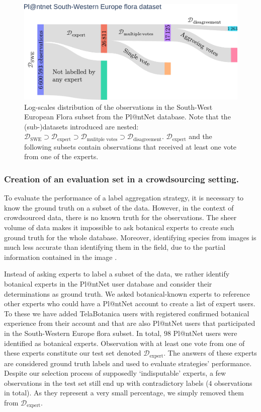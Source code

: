 \begin{figure}[tbh]
    \begin{center}
        \includegraphics[width=\textwidth]{./images_plantnet/sankey_v2.pdf}
    \end{center}
    \caption{Log-scales distribution of the observations in the South-West European Flora subset from the Pl@ntNet database. Note that the (sub-)datasets introduced are nested: $\mathcal{D}_{\mathrm{SWE}} \supset \mathcal{D}_\text{expert} \supset \mathcal{D}_{\text{mulitple votes}} \supset \mathcal{D}_{\text{disagreement}}$. $\mathcal{D}_{\text{expert}}$ and the following subsets contain observations that received at least one vote from one of the experts.}
    \label{fig:sankey}
\end{figure}

\subsubsection*{Creation of an evaluation set in a crowdsourcing setting.}

To evaluate the performance of a label aggregation strategy, it is necessary to know the ground truth on a subset of the data.
However, in the context of crowdsourced data, there is no known truth for the observations.
The sheer volume of data makes it impossible to ask botanical experts to create such ground truth for the whole database.
Moreover, identifying species from images is much less accurate than identifying them in the field, due to the partial information contained in the image \citep{experts2018plant}.

Instead of asking experts to label a subset of the data, we rather identify botanical experts in the Pl@ntNet user database and consider their determinations as ground truth.
We asked botanical-known experts to reference other experts who could have a Pl@ntNet account to create a list of expert users.
To these we have added TelaBotanica \citep{heaton2010tela} users with registered confirmed botanical experience from their account and that are also Pl@ntNet users that participated in the South-Western Europe flora subset.
In total, $98$ Pl@ntNet users were identified as botanical experts.
Observation with at least one vote from one of these experts constitute our test set denoted $\mathcal{D}_\text{expert}$.
The answers of these experts are considered ground truth labels and used to evaluate strategies' performance.
Despite our selection process of supposedly `indisputable' experts, a few observations in the test set still end up with contradictory labels ($4$ observations in total). As they represent a very small percentage, we simply removed them from $\mathcal{D}_\text{expert}$.

